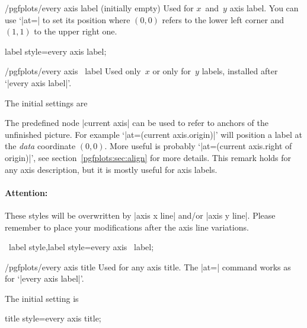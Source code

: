 \begin{stylekey}{/pgfplots/every axis label (initially empty)}
 Used for $x$~and~$y$ axis label. You can use `|at=| to set its position where $(0,0)$ refers to the lower left corner and $(1,1)$ to the upper right one.
\end{stylekey}

\pgfplotsshortstylekey label style=every axis label;

\begin{xystylekey}{/pgfplots/every axis \x\ label}
 Used only~$x$ or only for~$y$ labels, installed after `|every axis label|'.

 The initial settings are
\begin{codeexample}
\end{codeexample}

 The predefined node |current axis| can be used to refer to anchors of the unfinished picture. For example
 `|at={(current axis.origin)}|' will position a label at the \emph{data} coordinate $(0,0)$. More useful is probably
 `|at={(current axis.right of origin)}|', see
 section~\ref{pgfplots:sec:align} for more details. This remark holds
 for any axis description, but it is mostly useful for axis labels.

\paragraph{Attention:} These styles will be overwritten by |axis x line| and/or |axis y line|. Please remember to place your modifications after the axis line variations.
\end{xystylekey}

\pgfplotsshortxystylekeys \x\ label style,\x label style=every axis \x\ label;

\begin{stylekey}{/pgfplots/every axis title}
 Used for any axis title. The |at=| command works as for `|every axis label|'.

The initial setting is
\begin{codeexample}
\end{codeexample}
\end{stylekey}

\pgfplotsshortstylekey title style=every axis title;


